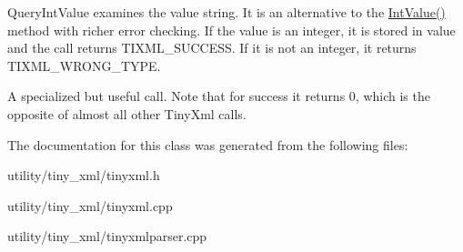 Query\+Int\+Value examines the value string. It is an alternative to the \hyperlink{class_ti_xml_attribute_ac8501370b065df31a35003c81d87cef2}{Int\+Value()} method with richer error checking. If the value is an integer, it is stored in \textquotesingle{}value\textquotesingle{} and the call returns T\+I\+X\+M\+L\+\_\+\+S\+U\+C\+C\+E\+SS. If it is not an integer, it returns T\+I\+X\+M\+L\+\_\+\+W\+R\+O\+N\+G\+\_\+\+T\+Y\+PE.

A specialized but useful call. Note that for success it returns 0, which is the opposite of almost all other Tiny\+Xml calls. 

The documentation for this class was generated from the following files\+:\begin{DoxyCompactItemize}
\item 
utility/tiny\+\_\+xml/tinyxml.\+h\item 
utility/tiny\+\_\+xml/tinyxml.\+cpp\item 
utility/tiny\+\_\+xml/tinyxmlparser.\+cpp\end{DoxyCompactItemize}
